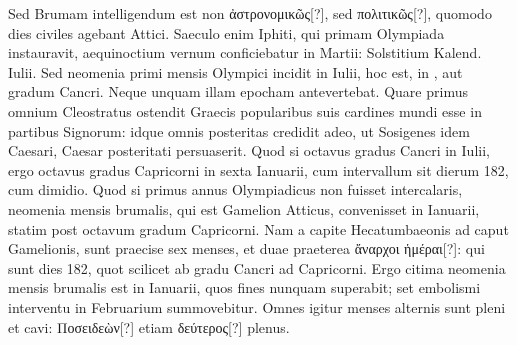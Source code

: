 Sed Brumam intelligendum est non \textgreek{ἀστρονομικῶς[?]},
sed \textgreek{πολιτικῶς[?]}, quomodo dies civiles agebant Attici.
Saeculo
enim Iphiti, qui primam Olympiada instauravit, aequinoctium vernum
conficiebatur in  Martii: Solstitium Kalend. Iulii.
Sed neomenia
primi mensis Olympici incidit in  Iulii, hoc est,
 in , aut
 gradum Cancri.
Neque unquam illam epocham antevertebat.
Quare primus omnium Cleostratus ostendit Graecis popularibus suis
cardines mundi esse in  partibus Signorum: idque omnis posteritas
credidit adeo, ut Sosigenes idem Caesari, Caesar posteritati persuaserit.
Quod si octavus gradus Cancri in  Iulii, ergo octavus gradus
Capricorni in sexta Ianuarii, cum intervallum sit dierum 182, cum
dimidio.
Quod si primus annus Olympiadicus non fuisset intercalaris,
neomenia mensis brumalis, qui est Gamelion Atticus, convenisset
in  Ianuarii, statim post octavum gradum Capricorni.
Nam a capite
Hecatumbaeonis ad caput Gamelionis, sunt praecise sex menses, et
duae praeterea \textgreek{ἄναρχοι ἡμέραι[?]}:
 qui sunt dies 182, quot scilicet ab  gradu
Cancri ad  Capricorni.
Ergo citima neomenia mensis brumalis
est in  Ianuarii, quos fines nunquam superabit; set embolismi
interventu in Februarium summovebitur.
Omnes igitur menses
alternis sunt pleni et cavi: \textgreek{Ποσειδεὼν[?]}
 etiam \textgreek{δεύτερος[?]} plenus.
%
\begin{table}[htbp]
 
\end{table}
